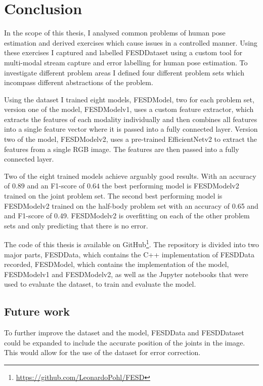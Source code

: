 \chapter{Conclusion}
\label{sec:conclusion}

In the scope of this thesis, I analysed common problems of human pose estimation and derived exercises which cause issues in a controlled manner. Using these exercises I captured and labelled FESDDataset using a custom tool for multi-modal stream capture and error labelling for human pose estimation. To investigate different problem areas I defined four different problem sets which incompass different abstractions of the problem. 

Using the dataset I trained eight models, FESDModel, two for each problem set, version one of the model, FESDModelv1, uses a custom feature extractor, which extracts the features of each modality individually and then combines all features into a single feature vector where it is passed into a fully connected layer. Version two of the model, FESDModelv2, uses a pre-trained EfficientNetv2 to extract the features from a single RGB image. The features are then passed into a fully connected layer.

Two of the eight trained models achieve arguably good results. With an accuracy of $0.89$ and an F1-score of $0.64$ the best performing model is FESDModelv2 trained on the joint problem set. The second best performing model is FESDModelv2 trained on the half-body problem set with an accuracy of 0.65 and and F1-score of 0.49. FESDModelv2 is overfitting on each of the other problem sets and only predicting that there is no error. %

The code of this thesis is available on GitHub\footnote{\url{https://github.com/LeonardoPohl/FESD}}. The repository is divided into two major parts, FESDData, which contains the C++ implementation of FESDData recorded, FESDModel, which contains the implementation of the model, FESDModelv1 and FESDModelv2, as well as the Jupyter notebooks that were used to evaluate the dataset, to train and evaluate the model.

\section{Future work}
\label{sec:future_work}

To further improve the dataset and the model, FESDData and FESDDataset could be expanded to include the accurate position of the joints in the image. This would allow for the use of the dataset for error correction.

